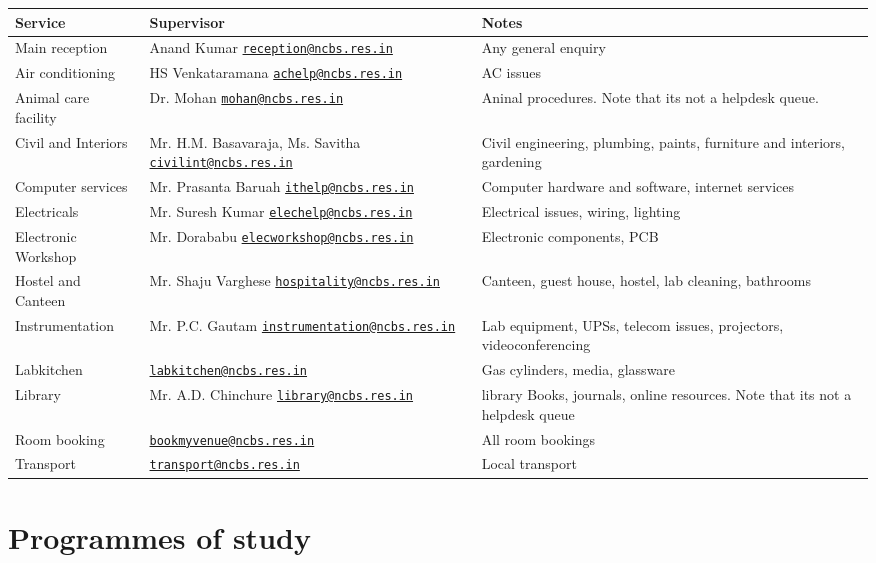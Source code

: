 \documentclass[a4paper]{extarticle}
\newcommand\MAILTOBREAK[2]{#1 \Letter\; \href{mailto:#2}{\nolinkurl{#2}}}
\begin{document}
\begin{tabularx}{\textwidth}{l X X}
    \toprule
    Service & Supervisor & Notes \\
    \midrule
    Main reception & \MAILTOBREAK{Anand Kumar}{reception@ncbs.res.in} & Any general enquiry \\
    Air conditioning & \MAILTOBREAK{HS Venkataramana}{achelp@ncbs.res.in} & AC issues \\
    Animal care facility & \MAILTOBREAK{Dr. Mohan}{mohan@ncbs.res.in} & Aninal
        procedures. Note that its not a helpdesk queue.  \\
    Civil and Interiors & \MAILTOBREAK{Mr. H.M. Basavaraja, Ms.
    Savitha}{civilint@ncbs.res.in} & Civil engineering, plumbing, paints,
        furniture and interiors, gardening \\
    Computer services & \MAILTOBREAK{Mr. Prasanta Baruah}{ithelp@ncbs.res.in} & 
        Computer hardware and software, internet services \\
    Electricals & \MAILTOBREAK{ Mr. Suresh Kumar}{elechelp@ncbs.res.in} & 
            Electrical issues, wiring, lighting \\
    Electronic Workshop & \MAILTOBREAK{Mr.  Dorababu}{elecworkshop@ncbs.res.in} & 
        Electronic components, PCB \\
    Hostel and Canteen & \MAILTOBREAK{Mr. Shaju Varghese}{hospitality@ncbs.res.in} & 
        Canteen, guest house, hostel, lab cleaning, bathrooms \\
    Instrumentation & \MAILTOBREAK{Mr. P.C. Gautam}{instrumentation@ncbs.res.in} &
        Lab equipment, UPSs, telecom issues, projectors, videoconferencing \\
    Labkitchen & \MAILTOBREAK{ }{labkitchen@ncbs.res.in} & Gas cylinders, media, glassware \\
    Library & \MAILTOBREAK{Mr. A.D. Chinchure}{library@ncbs.res.in} &
        library Books, journals, online resources. Note that its not a helpdesk
        queue \\
    Room booking & \MAILTOBREAK{ }{bookmyvenue@ncbs.res.in} & All room bookings \\
    Transport & \MAILTOBREAK{}{transport@ncbs.res.in} & Local transport \\
    \bottomrule
\end{tabularx}


\newpage
\section{Programmes of study}
\end{document}
